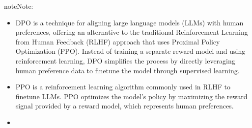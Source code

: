 \documentclass[letterpaper,11pt,english]{sphinxmanual}
\begin{document}
\begin{sphinxadmonition}{note}{Note:}\begin{itemize}
\item {} \begin{description}
\sphinxAtStartPar
DPO is a technique for aligning large
language models (LLMs) with human preferences, offering an alternative
to the traditional Reinforcement Learning from Human Feedback (RLHF)
approach that uses Proximal Policy Optimization (PPO). Instead of
training a separate reward model and using reinforcement learning,
DPO simplifies the process by directly leveraging human preference
data to fine\sphinxhyphen{}tune the model through supervised learning.

\end{description}

\item {} \begin{description}
\sphinxAtStartPar
PPO is a reinforcement learning algorithm
commonly used in RLHF to fine\sphinxhyphen{}tune LLMs. PPO optimizes the model’s policy
by maximizing the reward signal provided by a reward model, which
represents human preferences.

\end{description}

\item {} 
\sphinxAtStartPar
{}
\begin{quote}



\end{quote}
\end{itemize}
\end{sphinxadmonition}
\end{document}
